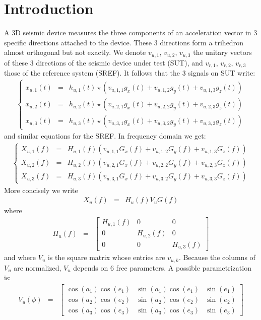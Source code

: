 \documentclass[a4paper, 12pt]{report}
\begin{document}
 \sloppy
\section{Introduction}
A 3D seismic device measures the three components of an acceleration vector in 3 specific directions attached to the device. These 3 directions form a trihedron almost orthogonal but not exactly. We denote $v_{u,1}$,  $v_{u,2}$,  $v_{u,3}$ the unitary vectors of these 3 directions of the seismic device under test (SUT), and  $v_{r,1}$,  $v_{r,2}$,  $v_{r,3}$ those of the reference system (SREF). It follows that the 3 signals on SUT write:
\begin{eqnarray*}
\left\{
\begin{array}{rcl}
x_{u,1}(t)&=&h_{u,1}(t)\star (v_{u,1,1}g_{x}(t)+v_{u,1,2}g_{y}(t)+v_{u,1,3}g_{z}(t))
\\
x_{u,2}(t)&=&h_{u,2}(t)\star (v_{u,2,1}g_{x}(t)+v_{u,2,2}g_{y}(t)+v_{u,2,3}g_{z}(t))
\\
x_{u,3}(t)&=&h_{u,3}(t)\star (v_{u,3,1}g_{x}(t)+v_{u,3,2}g_{y}(t)+v_{u,3,3}g_{z}(t))
\end{array}
\right.
\end{eqnarray*}
and similar equations for the SREF. In frequency domain we get:
\begin{eqnarray*}
\left\{
\begin{array}{rcl}
X_{u,1}(f)&=&H_{u,1}(f) (v_{u,1,1}G_{x}(f)+v_{u,1,2}G_{y}(f)+v_{u,1,3}G_{z}(f))
\\
X_{u,2}(f)&=&H_{u,2}(f) (v_{u,2,1}G_{x}(f)+v_{u,2,2}G_{y}(f)+v_{u,2,3}G_{z}(f))
\\
X_{u,3}(f)&=&H_{u,3}(f) (v_{u,3,1}G_{x}(f)+v_{u,3,2}G_{y}(f)+v_{u,3,3}G_{z}(f))
\end{array}
\right.
\end{eqnarray*}
More concisely we write
\begin{eqnarray*}
X_{u}(f)&=&H_{u}(f)V_{u}G(f)
\end{eqnarray*}
where 
\begin{eqnarray*}
H_{u}(f)&=&
\begin{bmatrix}
H_{u,1}(f)&0&0
\\
0&H_{u,2}(f)&0
\\
0&0&H_{u,3}(f)
\end{bmatrix}
\end{eqnarray*}
and where $V_{u}$ is the square matrix whose entries are $v_{u,k}$. Because the columns of $V_{u}$ are normalized, $V_{u}$ depends on 6 free parameters. A possible parametrization is:
\begin{eqnarray}
\label{eq:parametricformofV}
V_{u}(\phi)&=&
\begin{bmatrix}
\cos(a_{1})\cos(e_{1})&\sin(a_{1})\cos(e_{1})&\sin(e_{1})
\\
\cos(a_{2})\cos(e_{2})&\sin(a_{2})\cos(e_{2})&\sin(e_{2})
\\
\cos(a_{3})\cos(e_{3})&\sin(a_{3})\cos(e_{3})&\sin(e_{3})
\end{bmatrix}
\end{eqnarray}
\end{document}
